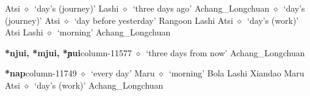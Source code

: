 \hspace{1ex}
         Atsi 
\hspace{1ex}
         $\diamond$~`day's (journey)'
         Lashi 
\hspace{1ex}
         $\diamond$~`three days ago'
         Achang\_Longchuan 
\hspace{1ex}
         $\diamond$~`day's (journey)'
         Atsi 
\hspace{1ex}
         $\diamond$~`day before yesterday'
         Rangoon 
\hspace{1ex}
         Lashi 
\hspace{1ex}
         Atsi 
\hspace{1ex}
         $\diamond$~`day's (work)'
         Atsi 
\hspace{1ex}
         Lashi 
\hspace{1ex}
         $\diamond$~`morning'
         Achang\_Longchuan 
  \item {\footnotesize \textbf{*njui, *mjui, *ɲui}}{\tiny column-11577}
         $\diamond$~`three days from now'
         Achang\_Longchuan 
  \item {\footnotesize \textbf{*nap}}{\tiny column-11749}
         $\diamond$~`every day'
         Maru 
\hspace{1ex}
         $\diamond$~`morning'
         Bola 
\hspace{1ex}
         Lashi 
\hspace{1ex}
         Xiandao 
\hspace{1ex}
         Maru 
\hspace{1ex}
         Atsi 
\hspace{1ex}
         $\diamond$~`day's (work)'
         Achang\_Longchuan 
\hspace{1ex}
